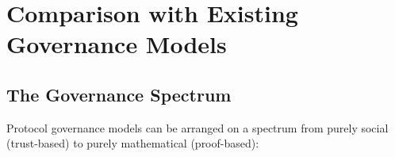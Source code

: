\documentclass[12pt,a4paper]{article}
\theoremstyle{remark}
\begin{document}
\newpage

\section{}
\section{Comparison with Existing Governance Models}

\subsection{The Governance Spectrum}

Protocol governance models can be arranged on a spectrum from purely social
(trust-based) to purely mathematical (proof-based):
\end{document}
